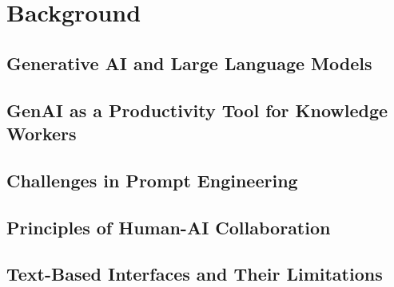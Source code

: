 
\chapter{Background}\label{chapter:background}
\section{Generative AI and Large Language Models}

\section{GenAI as a Productivity Tool for Knowledge Workers}

\section{Challenges in Prompt Engineering}

\section{Principles of Human-AI Collaboration}

\section{Text-Based Interfaces and Their Limitations}